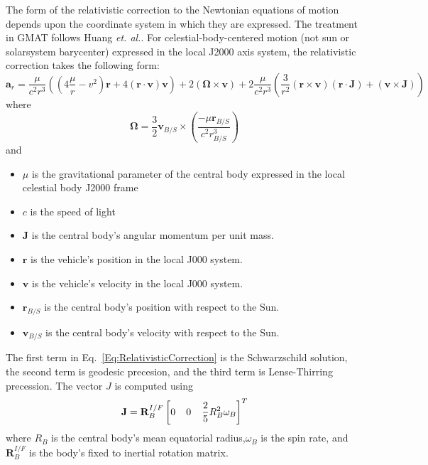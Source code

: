 The form of the relativistic correction to the Newtonian equations of motion depends upon the coordinate system in which they are expressed.  The treatment in GMAT follows Huang\cite{Huang:90} \emph{et. al.}. For celestial-body-centered motion (not sun or solarsystem barycenter) expressed in the local J2000 axis system, the relativistic correction takes the following form:
%
\begin{equation}
    \mathbf{a}_r = \frac{\mu}{c^2 r^3}\left(  \left( 4\frac{\mu}{r} - v^2\right)\mathbf{r} +   4(\mathbf{r}\cdot\mathbf{v})\mathbf{v}\right) + 2 (\boldsymbol{\Omega} \times \mathbf{v}) + 2 \frac{\mu}{c^2 r^3}
    \left( \frac{3}{r^2}(\mathbf{r} \times \mathbf{v})(\mathbf{r} \cdot \mathbf{J}) +(\mathbf{v}\times\mathbf{J}) \right)
    \label{Eq:RelativisticCorrection}
\end{equation}
%
where
%
\begin{equation}
   \boldsymbol{\Omega} = \frac{3}{2} \mathbf{v}_{B/S} \times \left( \frac{-\mu \mathbf{r}_{B/S}}{c^2r_{B/S}^3} \right)
\end{equation}
%
and
%
\begin{itemize}
   \item  $\mu$ is the gravitational parameter of the central body expressed in the local celestial body J2000 frame
   \item  $c$ is the speed of light
   \item  $\mathbf{J}$ is the central body's angular momentum per unit mass.
   \item  $\mathbf{r}$ is the vehicle's position in the local J000 system.
   \item  $\mathbf{v}$ is the vehicle's velocity in the local J000 system.
   \item  $\mathbf{r}_{B/S}$ is the central body's position with respect to the Sun.
   \item  $\mathbf{v}_{B/S}$ is the central body's velocity with respect to the Sun.
\end{itemize}
%
The first term in Eq.~\ref{Eq:RelativisticCorrection} is the Schwarzschild solution, the second term is geodesic precesion, and the third term is Lense-Thirring precession.  The vector $J$ is computed using
%
\begin{equation}
    \mathbf{J} = \mathbf{R}_B^{I/F}\left[ 0   \hspace{0.15 in} 0  \hspace{0.15 in}   \frac{2}{5}R_B^2 \omega_B \right]^T
\end{equation}
%
where $R_B$ is the central body's mean equatorial radius,$\omega_B$ is the spin rate, and $\mathbf{R}_B^{I/F}$ is the
body's fixed to inertial rotation matrix.

